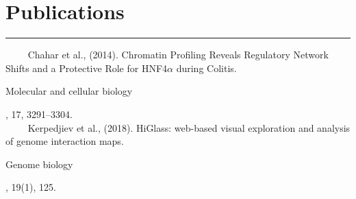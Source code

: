 \documentclass[letterpaper]{resume} %
\newcommand{\colorrule}[1]{%
\begingroup\color{#1}\hrule\endgroup%
}%
\begin{document}
\section{Publications}
\normalfont
\colorrule{black}
\vspace{2 mm}
\quad \ \ \textbullet{} \ \ Chahar et al., (2014). Chromatin Profiling Reveals Regulatory Network Shifts and a Protective Role for HNF4$\alpha$ during \hspace*{8 mm} Colitis. \begin{em}Molecular and cellular biology\end{em}, 17, 3291–3304. \\
\quad \ \ \textbullet{} \ \ Kerpedjiev et al., (2018). HiGlass: web-based visual exploration and analysis of genome interaction maps. \begin{em}Genome biology\end{em}, \hspace*{8 mm} 19(1), 125. 
%
%








\sectionspace %



\sectionspace %

\end{document}
